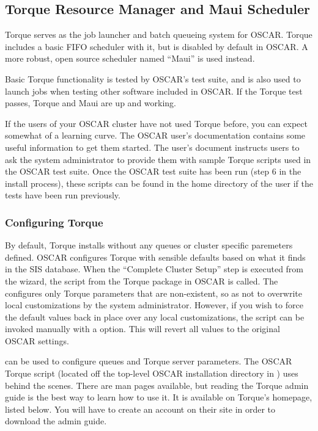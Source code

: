 %
%
%

\subsection{Torque Resource Manager and Maui Scheduler}
\label{app:torque-overview}

Torque serves as the job launcher and batch queueing system for
OSCAR. Torque includes a basic FIFO scheduler with it, but is
disabled by default in OSCAR.  A more robust, open source scheduler
named ``Maui'' is used instead.

Basic Torque functionality is tested by OSCAR's test suite, and is
also used to launch jobs when testing other software included in
OSCAR. If the Torque test passes, Torque and Maui are up and
working.

If the users of your OSCAR cluster have not used Torque before, you
can expect somewhat of a learning curve.  The OSCAR user's
documentation contains some useful information to get them started.
The user's document instructs users to ask the system administrator
to provide them with sample Torque scripts used in the OSCAR test
suite.  Once the OSCAR test suite has been run (step 6 in the
install process), these scripts can be found in the home directory
of the  user if the tests have been run previously.

\subsubsection{Configuring Torque}

By default, Torque installs without any queues or cluster specific
paremeters defined.  OSCAR configures Torque with sensible defaults
based on what it finds in the SIS database.  When the ``Complete
Cluster Setup'' step is executed from the wizard, the
 script from the Torque package in OSCAR is
called. The  configures only Torque parameters
that are non-existent, so as not to overwrite local customizations
by the system administrator.  However, if you wish to force the
default values back in place over any local customizations, the
 script can be invoked manually with a
 option.  This will revert all values to the original
OSCAR settings.

 can be used to configure queues and Torque server
parameters. The OSCAR Torque  script (located off
the top-level OSCAR installation directory in
) uses  behind the scenes.
There are man pages available, but reading the Torque admin guide is
the best way to learn how to use it. It is available on Torque's
homepage, listed below.  You will have to create an account on their
site in order to download the admin guide.

